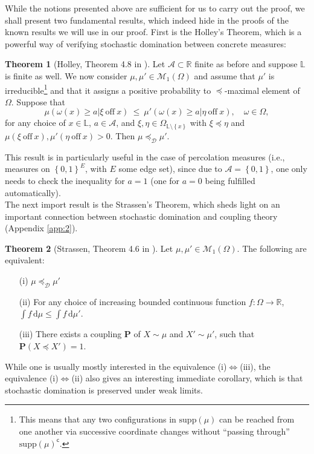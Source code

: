 \documentclass[12pt]{article}
\newcommand{\A}{\mathcal{A}}
\newcommand{\D}{\mathcal{D}}
\renewcommand{\d}{\mathrm{d}}
\renewcommand{\L}{\mathbb{L}}
\newcommand{\M}{\mathcal{M}}
\newcommand{\PP}{\mathbf{P}}
\newcommand{\R}{\mathbb{R}}
\newcommand{\set}[1]{\left\{#1\right\}}
\newcommand{\ra}{\rightarrow}
\newcommand{\1}{\mathbbm{1}}
\renewcommand{\c}{\mathsf{c}}
\newcommand{\supp}{\mathrm{supp}}
\newcommand{\5}{\vspace{0.5cm}}
\theoremstyle{definition}
\newtheorem{thm}{Theorem}[section]
\begin{document}
While the notions presented above are sufficient for us to carry out the proof, we shall present two fundamental results, which indeed hide in the proofs of the known results we will use in our proof. First is the Holley's Theorem, which is a powerful way of verifying stochastic domination between concrete measures:
\begin{thm}[Holley, Theorem 4.8 in \cite{GHM}]\label{Holley}
Let $\A\subset\R$ finite as before and suppose $\L$ is finite as well. We now consider $\mu,\mu'\in\M_1(\Omega)$ and assume that $\mu'$ is irreducible\footnote{This means that any two configurations in $\supp(\mu)$ can be reached from one another via successive coordinate changes without ``passing through'' $\supp(\mu)^\c$.} and that it assigns a positive probability to $\preceq$-maximal element of $\Omega$. Suppose that
$$\mu(\omega(x)\geq a|\xi~\text{off}~x) ~\leq~ \mu'(\omega(x)\geq a|\eta~\text{off}~x), \quad \omega\in\Omega,$$
for any choice of $x\in\L$, $a\in \A$, and $\xi,\eta\in\Omega_{\L\setminus\set{x}}$ with $\xi\preceq\eta$ and $\mu(\xi~\text{off}~x),\mu'(\eta~\text{off}~x)>0$. Then $\mu\preceq_\D\mu'$.
\end{thm}

This result is in particularly useful in the case of percolation measures (i.e., measures on $\set{0,1}^E$, with $E$ some edge set), since due to $\A=\set{0,1}$, one only needs to check the inequality for $a=1$ (one for $a=0$ being fulfilled automatically). \\

The next import result is the Strassen's Theorem, which sheds light on an important connection between stochastic domination and coupling theory (Appendix \ref{app:2}). 

\begin{thm}[Strassen, Theorem 4.6 in \cite{GHM}]
Let $\mu,\mu'\in\M_1(\Omega)$. The following are equivalent:
\begin{itemize}
	\item[(i)] $\mu\preceq_\D\mu'$
	\item[(ii)] For any choice of increasing bounded continuous function $f:\Omega\ra\R$, $\int f\,\d\mu\leq \int f\,\d\mu'$.
	\item[(iii)] There exists a coupling $\PP$ of $X\sim\mu$ and $X'\sim\mu'$, such that $\PP(X\preceq X')=1$.
\end{itemize}
\end{thm}

While one is usually mostly interested in the equivalence (i)$\Leftrightarrow$(iii), the equivalence (i)$\Leftrightarrow$(ii) also gives an interesting immediate corollary, which is that stochastic domination is preserved under weak limits.
\end{document}
